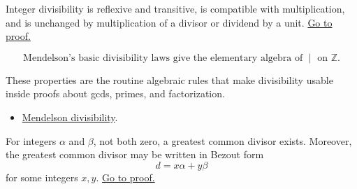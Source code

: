 \begin{theorem}
\label{thm:men-basic-divisibility-properties}
Integer divisibility is reflexive and transitive, is compatible with
multiplication, and is unchanged by multiplication of a divisor or dividend by
a unit.
\hyperref[prf:men-basic-divisibility-properties]{Go to proof.}
\end{theorem}

\begin{remark*}
\[
  \text{Mendelson's basic divisibility laws give the elementary algebra of }
  \mid \text{ on } \mathbb{Z}.
\]
\end{remark*}

\begin{remark*}[Interpretation]
These properties are the routine algebraic rules that make divisibility usable
inside proofs about gcds, primes, and factorization.
\end{remark*}

\begin{dependencies}
\begin{itemize}
  \item \hyperref[def:men-divisibility]{Mendelson divisibility}.
\end{itemize}
\end{dependencies}

\begin{theorem}
\label{thm:men-gcd-bezout}
For integers \(\alpha\) and \(\beta\), not both zero, a greatest common divisor
exists. Moreover, the greatest common divisor may be written in Bezout form
\[
  d = x\alpha+y\beta
\]
for some integers \(x,y\).
\hyperref[prf:men-gcd-bezout]{Go to proof.}
\end{theorem}

